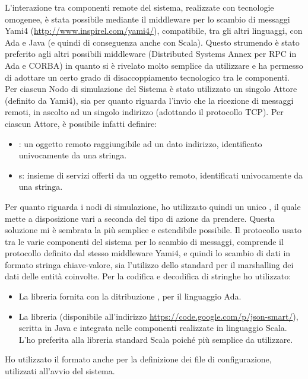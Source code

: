 L'interazione tra componenti remote del sistema, realizzate con tecnologie omogenee, è stata possibile mediante il middleware per lo scambio di messaggi Yami4 (\url{http://www.inspirel.com/yami4/}), compatibile, tra gli altri linguaggi, con Ada e Java (e quindi di conseguenza anche con Scala). Questo strumendo è stato preferito agli altri possibili middleware (Distributed Systems Annex per RPC in Ada e CORBA) in quanto si è rivelato molto semplice da utilizzare e ha permesso di adottare un certo grado di disaccoppiamento tecnologico tra le componenti. Per ciascun Nodo di simulazione del Sistema è stato utilizzato un singolo Attore (definito da Yami4), sia per quanto riguarda l'invio che la ricezione di messaggi remoti, in ascolto ad un singolo indirizzo (adottando il protocollo TCP). Per ciascun Attore, è possibile infatti definire:
	\begin{itemize}
		\item {}: un oggetto remoto raggiungibile ad un dato indirizzo, identificato univocamente da una stringa.
		\item {}s: insieme di servizi offerti da un oggetto remoto, identificati univocamente da una stringa.
	\end{itemize}
Per quanto riguarda i nodi di simulazione, ho utilizzato quindi un unico , il quale mette a disposizione vari  a seconda del tipo di azione da prendere. Questa soluzione mi è sembrata la più semplice e estendibile possibile.
Il protocollo usato tra le varie componenti del sistema per lo scambio di messaggi, comprende il protocollo definito dal stesso middleware Yami4, e quindi lo scambio di dati in formato stringa chiave-valore, sia l'utilizzo dello standard  per il marshalling dei dati delle entità coinvolte. Per la codifica e decodifica di stringhe  ho utilizzato:
	\begin{itemize}
		\item La libreria  fornita con la ditribuzione , per il linguaggio Ada.
		\item La libreria  (disponibile all'indirizzo \url{https://code.google.com/p/json-smart/}), scritta in Java e integrata nelle componenti realizzate in linguaggio Scala. L'ho preferita alla libreria standard Scala  poiché più semplice da utilizzare.
		
	\end{itemize}
	Ho utilizzato il formato  anche per la definizione dei file di configurazione, utilizzati all'avvio del sistema.





